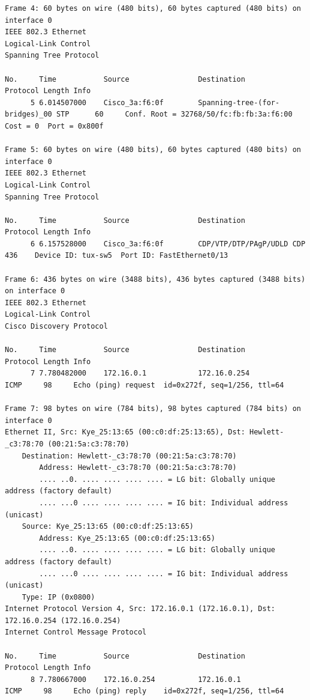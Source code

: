 \documentclass[a4paper,11pt]{article}
\begin{document}
\begin{lstlisting}
Frame 4: 60 bytes on wire (480 bits), 60 bytes captured (480 bits) on interface 0
IEEE 802.3 Ethernet 
Logical-Link Control
Spanning Tree Protocol

No.     Time           Source                Destination           Protocol Length Info
      5 6.014507000    Cisco_3a:f6:0f        Spanning-tree-(for-bridges)_00 STP      60     Conf. Root = 32768/50/fc:fb:fb:3a:f6:00  Cost = 0  Port = 0x800f

Frame 5: 60 bytes on wire (480 bits), 60 bytes captured (480 bits) on interface 0
IEEE 802.3 Ethernet 
Logical-Link Control
Spanning Tree Protocol

No.     Time           Source                Destination           Protocol Length Info
      6 6.157528000    Cisco_3a:f6:0f        CDP/VTP/DTP/PAgP/UDLD CDP      436    Device ID: tux-sw5  Port ID: FastEthernet0/13  

Frame 6: 436 bytes on wire (3488 bits), 436 bytes captured (3488 bits) on interface 0
IEEE 802.3 Ethernet 
Logical-Link Control
Cisco Discovery Protocol

No.     Time           Source                Destination           Protocol Length Info
      7 7.780482000    172.16.0.1            172.16.0.254          ICMP     98     Echo (ping) request  id=0x272f, seq=1/256, ttl=64

Frame 7: 98 bytes on wire (784 bits), 98 bytes captured (784 bits) on interface 0
Ethernet II, Src: Kye_25:13:65 (00:c0:df:25:13:65), Dst: Hewlett-_c3:78:70 (00:21:5a:c3:78:70)
    Destination: Hewlett-_c3:78:70 (00:21:5a:c3:78:70)
        Address: Hewlett-_c3:78:70 (00:21:5a:c3:78:70)
        .... ..0. .... .... .... .... = LG bit: Globally unique address (factory default)
        .... ...0 .... .... .... .... = IG bit: Individual address (unicast)
    Source: Kye_25:13:65 (00:c0:df:25:13:65)
        Address: Kye_25:13:65 (00:c0:df:25:13:65)
        .... ..0. .... .... .... .... = LG bit: Globally unique address (factory default)
        .... ...0 .... .... .... .... = IG bit: Individual address (unicast)
    Type: IP (0x0800)
Internet Protocol Version 4, Src: 172.16.0.1 (172.16.0.1), Dst: 172.16.0.254 (172.16.0.254)
Internet Control Message Protocol

No.     Time           Source                Destination           Protocol Length Info
      8 7.780667000    172.16.0.254          172.16.0.1            ICMP     98     Echo (ping) reply    id=0x272f, seq=1/256, ttl=64


\end{lstlisting}
\end{document}
